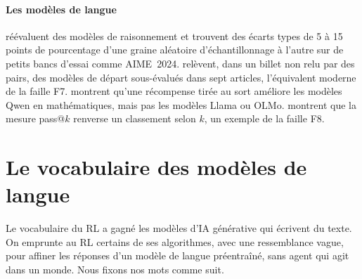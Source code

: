\paragraph{Les modèles de langue}
\textcite{hochlehnert2025sober} réévaluent des modèles de raisonnement et trouvent des écarts types de 5
à 15 points de pourcentage d'une graine aléatoire d'échantillonnage à l'autre sur de petits bancs
d'essai comme AIME~2024. \textcite{chandak2025incorrect} relèvent, dans un billet non relu par des pairs,
des modèles de départ sous-évalués dans sept articles, l'équivalent moderne de la faille F7.
\textcite{shao2025spurious} montrent qu'une récompense tirée au sort améliore les modèles Qwen en
mathématiques, mais pas les modèles Llama ou OLMo. \textcite{yue2025rlvr} montrent que la mesure pass@$k$
renverse un classement selon $k$, un exemple de la faille F8.

\section{Le vocabulaire des modèles de langue}\label{sec:vocabulaire}

Le vocabulaire du RL a gagné les modèles d'IA générative qui écrivent du texte. On emprunte au RL
certains de ses algorithmes, avec une ressemblance vague, pour affiner les réponses d'un modèle de
langue préentraîné, sans agent qui agit dans un monde. Nous fixons nos mots comme suit.

